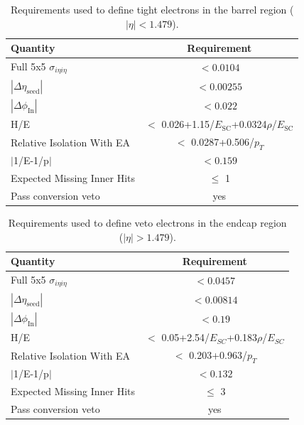 \begin{table}[htbp]
\centering
\def\arraystretch{1.2}
\begin{tabular}{|l|c|}
    \hline\hline
    Quantity & Requirement \\\hline
    Full 5x5 $\sigma_{i\eta i\eta}$ &  $< 0.0104$ \\
    $|\Delta\eta_{\mathrm{seed}}|$ & $< 0.00255$  \\
    $|\Delta\phi_{\mathrm{In}}|$ & $< 0.022$ \\
    H/E & $<$ 0.026+1.15/$E_{\mathrm{SC}}$+0.0324$\rho$/$E_{\mathrm{SC}}$ \\
    Relative Isolation With EA & $<$ 0.0287+0.506/$p_T$ \\
    $|$1/E-1/p$|$ & $< 0.159$ \\
    Expected Missing Inner Hits & $\leq$ 1 \\
    Pass conversion veto & yes \\
    \hline\hline
\end{tabular}
\caption{Requirements used to define tight electrons in the barrel region ($|\eta| < 1.479$).}
\label{tab:tight_electron_def_barrel}
\end{table}

\begin{table}[htbp]
\centering
\def\arraystretch{1.2}
\begin{tabular}{|l|c|}
    \hline\hline
    Quantity & Requirement \\\hline
    Full 5x5 $\sigma_{i\eta i\eta}$ &  $< 0.0457$ \\
    $|\Delta\eta_{\mathrm{seed}}|$ & $< 0.00814$  \\
    $|\Delta\phi_{\mathrm{In}}|$ & $< 0.19$ \\
    H/E & $<$ 0.05+2.54/$E_{SC}$+0.183$\rho$/$E_{SC}$ \\
    Relative Isolation With EA & $<$ 0.203+0.963/$p_T$ \\
    $|$1/E-1/p$|$ & $< 0.132$ \\
    Expected Missing Inner Hits & $\leq$ 3 \\
    Pass conversion veto & yes \\
    \hline\hline
\end{tabular}
\caption{Requirements used to define veto electrons in the endcap region ($|\eta| > 1.479$).}
\label{tab:veto_electron_def_endcap}
\end{table}


